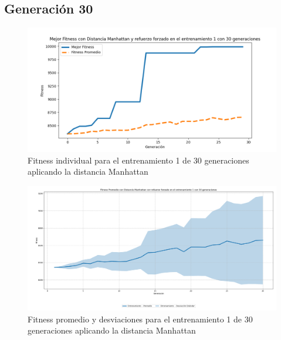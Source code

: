 \documentclass[lettersize, journal]{IEEEtran}
\begin{document}

\subsection{Generación 30}
\setcounter{figure}{0}
\renewcommand{\thefigure}{S\arabic{figure}B-M}

\begin{figure}[H]
    \centering
    \includegraphics[width=0.9 \linewidth]{Manhattan/Fitness_individual_30Gen/Fitness_1_Mahn_30Gen.png}
    \caption{Fitness individual para el entrenamiento 1 de 30 generaciones aplicando la distancia Manhattan}
    \label{fig:manhattan_1_30}
\end{figure}
\begin{figure}[H]
    \centering
    \includegraphics[width=0.9 \linewidth]{Manhattan/Fitness_individual_30Gen/Fitness_1_Mahn_30Gen_Sombra.png}
    \caption{Fitness promedio y desviaciones para el entrenamiento 1 de 30 generaciones aplicando la distancia Manhattan}
    \label{fig:manhattan_1_30_sombra}
\end{figure}
\end{document}
